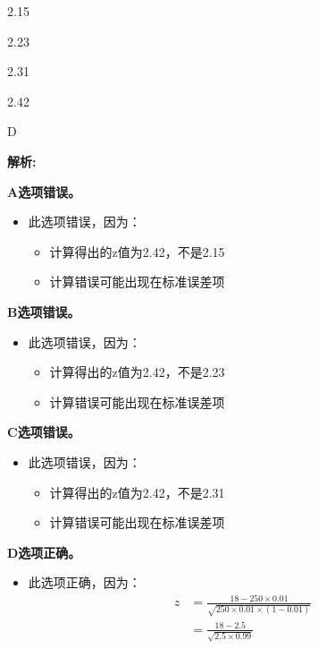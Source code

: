 \documentclass{article}
\newenvironment{explanation}
{\textbf{解析:}\par}
{\par}
\begin{document}
\begin{choices}
    \item 2.15
    \item 2.23
    \item 2.31
    \item 2.42
\end{choices}

\begin{correctanswer}
    D
\end{correctanswer}

\begin{explanation}
    \textbf{A选项错误。}
    \begin{itemize}
        \item 此选项错误，因为：
        \begin{itemize}
            \item 计算得出的z值为2.42，不是2.15
            \item 计算错误可能出现在标准误差项
        \end{itemize}
    \end{itemize}
    \textbf{B选项错误。}
    \begin{itemize}
        \item 此选项错误，因为：
        \begin{itemize}
            \item 计算得出的z值为2.42，不是2.23
            \item 计算错误可能出现在标准误差项
        \end{itemize}
    \end{itemize}
    \textbf{C选项错误。}
    \begin{itemize}
        \item 此选项错误，因为：
        \begin{itemize}
            \item 计算得出的z值为2.42，不是2.31
            \item 计算错误可能出现在标准误差项
        \end{itemize}
    \end{itemize}
    \textbf{D选项正确。}
    \begin{itemize}
        \item 此选项正确，因为：
        \begin{align*}
            z &= \frac{18 - 250 \times 0.01}{\sqrt{250 \times 0.01 \times (1 - 0.01)}} \\
            &= \frac{18 - 2.5}{\sqrt{2.5 \times 0.99}} \\

\end{align*}
\end{itemize}
\end{explanation}
\end{document}
